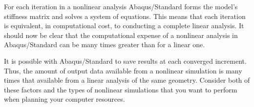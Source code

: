 For each iteration in a nonlinear analysis Abaqus/Standard forms the model's stiffness matrix and solves a system of equations. This means that each iteration is equivalent, in computational cost, to conducting a complete linear analysis. It should now be clear that the computational expense of a nonlinear analysis in Abaqus/Standard can be many times greater than for a linear one.

It is possible with Abaqus/Standard to save results at each converged increment. Thus, the amount of output data available from a nonlinear simulation is many times that available from a linear analysis of the same geometry. Consider both of these factors and the types of nonlinear simulations that you want to perform when planning your computer resources.
